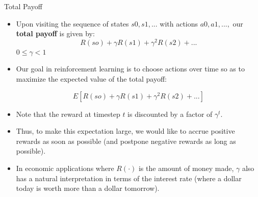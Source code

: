 \documentclass[handout]{beamer}
\begin{document}
\begin{frame}{Total Payoff}
\scriptsize{
\begin{itemize}
\item Upon visiting the sequence of states $s0 , s1 , ...$ with actions $a0, a1, ...,$ our
\textbf{total payoff} is given by:
\begin{displaymath}
 R(so)+\gamma R(s1)+\gamma^2R(s2)+...
\end{displaymath}
$0 \leq \gamma < 1$

\item Our goal in reinforcement learning is to choose actions over time so as to
maximize the expected value of the total payoff:

\begin{displaymath}
 E[R(so)+\gamma R(s1)+\gamma^2R(s2)+...]
\end{displaymath}

\item Note that the reward at timestep $t$ is discounted by a factor of $\gamma^t$.
\item Thus, to make this expectation large, we would like to accrue positive rewards as soon
as possible (and postpone negative rewards as long as possible). 
\item In economic applications where $R(\cdot)$ is the amount of money made, $\gamma$ also has a natural interpretation in terms of the interest rate (where a dollar today is worth
more than a dollar tomorrow).


\end{itemize}


} 

\end{frame}
\end{document}
